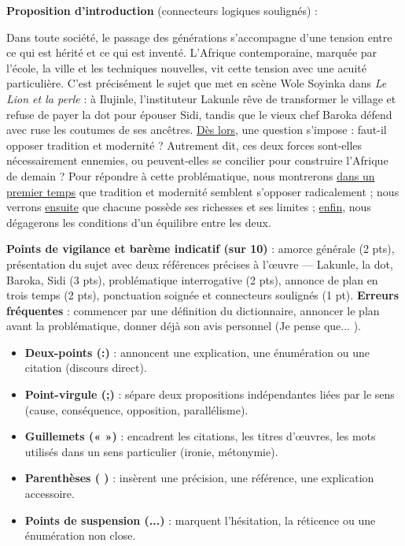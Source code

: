 \documentclass[11pt]{article}
\newcounter{popsec}
\newcounter{popsub}
\newcommand{\courssub}[1]{%
  \stepcounter{popsub}%
  \par\vspace{9pt}\noindent{\popxbold\fontsize{11.5}{13}\selectfont\color{popink}{\color{poporange}\thepopsec.\thepopsub}\hspace{6pt}#1}\par\nopagebreak\vspace{4pt}
}
\begin{document}
\begin{corrige}
\textbf{Proposition d'introduction} (connecteurs logiques soulignés) :

Dans toute société, le passage des générations s'accompagne d'une tension entre ce qui est hérité et ce qui est inventé. L'Afrique contemporaine, marquée par l'école, la ville et les techniques nouvelles, vit cette tension avec une acuité particulière. C'est précisément le sujet que met en scène Wole Soyinka dans \emph{Le Lion et la perle} : à Ilujinle, l'instituteur Lakunle rêve de transformer le village et refuse de payer la dot pour épouser Sidi, tandis que le vieux chef Baroka défend avec ruse les coutumes de ses ancêtres. \underline{Dès lors}, une question s'impose : faut-il opposer tradition et modernité ? Autrement dit, ces deux forces sont-elles nécessairement ennemies, ou peuvent-elles se concilier pour construire l'Afrique de demain ? Pour répondre à cette problématique, nous montrerons \underline{dans un premier temps} que tradition et modernité semblent s'opposer radicalement ; nous verrons \underline{ensuite} que chacune possède ses richesses et ses limites ; \underline{enfin}, nous dégagerons les conditions d'un équilibre entre les deux.

\textbf{Points de vigilance et barème indicatif (sur 10)} : amorce générale (2 pts), présentation du sujet avec deux références précises à l'œuvre — Lakunle, la dot, Baroka, Sidi (3 pts), problématique interrogative (2 pts), annonce de plan en trois temps (2 pts), ponctuation soignée et connecteurs soulignés (1 pt). \textbf{Erreurs fréquentes} : commencer par une définition du dictionnaire, annoncer le plan avant la problématique, donner déjà son avis personnel (\og Je pense que... \fg).
\end{corrige}

\courssub{Outils linguistiques de la dissertation}

\begin{aretenir}
\begin{itemize}
\item \textbf{Deux-points (:)} : annoncent une explication, une énumération ou une citation (discours direct).
\item \textbf{Point-virgule (;)} : sépare deux propositions indépendantes liées par le sens (cause, conséquence, opposition, parallélisme).
\item \textbf{Guillemets (« »)} : encadrent les citations, les titres d'œuvres, les mots utilisés dans un sens particulier (ironie, métonymie).
\item \textbf{Parenthèses ( )} : insèrent une précision, une référence, une explication accessoire.
\item \textbf{Points de suspension (...)} : marquent l'hésitation, la réticence ou une énumération non close.
\end{itemize}
\end{aretenir}
\end{document}
